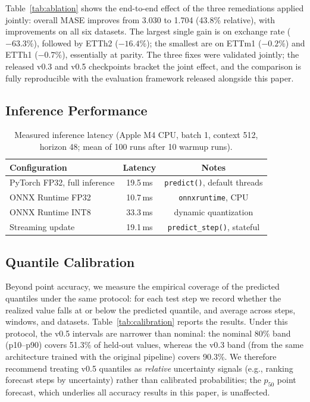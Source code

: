 \documentclass[11pt]{article}
\begin{document}
Table~\ref{tab:ablation} shows the end-to-end effect of the three remediations applied jointly: overall MASE improves from 3.030 to 1.704 (43.8\% relative), with improvements on all six datasets. The largest single gain is on exchange rate ($-63.3\%$), followed by ETTh2 ($-16.4\%$); the smallest are on ETTm1 ($-0.2\%$) and ETTh1 ($-0.7\%$), essentially at parity. The three fixes were validated jointly; the released v0.3 and v0.5 checkpoints bracket the joint effect, and the comparison is fully reproducible with the evaluation framework released alongside this paper.

\subsection{Inference Performance}
\label{sec:inference}

\begin{table}[h]
\centering
\caption{Measured inference latency (Apple M4 CPU, batch 1, context 512, horizon 48; mean of 100 runs after 10 warmup runs).}
\label{tab:latency}
\begin{tabular}{lcc}
\toprule
Configuration & Latency & Notes \\
\midrule
PyTorch FP32, full inference    & 19.5\,ms & \texttt{predict()}, default threads \\
ONNX Runtime FP32               & 10.7\,ms & \texttt{onnxruntime}, CPU \\
ONNX Runtime INT8               & 33.3\,ms & dynamic quantization \\
Streaming update                & 19.1\,ms & \texttt{predict\_step()}, stateful \\
\bottomrule
\end{tabular}
\end{table}

\subsection{Quantile Calibration}
\label{sec:calibration}

Beyond point accuracy, we measure the empirical coverage of the predicted quantiles under the same protocol: for each test step we record whether the realized value falls at or below the predicted quantile, and average across steps, windows, and datasets. Table~\ref{tab:calibration} reports the results. Under this protocol, the v0.5 intervals are narrower than nominal: the nominal 80\% band (p10--p90) covers 51.3\% of held-out values, whereas the v0.3 band (from the same architecture trained with the original pipeline) covers 90.3\%. We therefore recommend treating v0.5 quantiles as \emph{relative} uncertainty signals (e.g., ranking forecast steps by uncertainty) rather than calibrated probabilities; the $p_{50}$ point forecast, which underlies all accuracy results in this paper, is unaffected.
\end{document}
